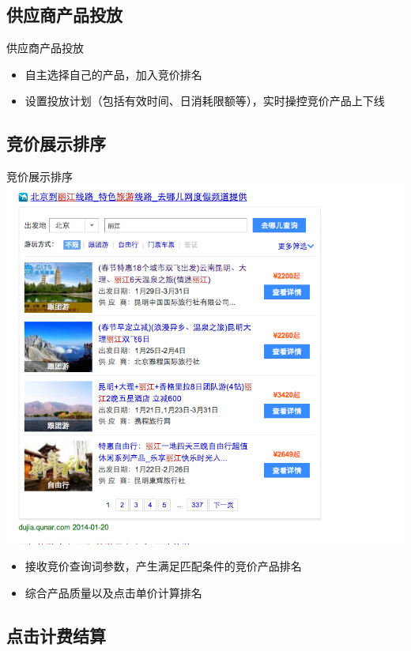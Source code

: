 \documentclass{beamer}
\begin{document}
\begin{CJK}{UTF8}{gbsn}
\subsection{供应商产品投放}
\begin{frame}{供应商产品投放}
  \begin{itemize}
  \item {
    自主选择自己的产品，加入竞价排名
    \pause
  }
  \item {
    设置投放计划（包括有效时间、日消耗限额等），实时操控竞价产品上下线
  }
  \end{itemize}
\end{frame}


\subsection{竞价展示排序}

\begin{frame}{竞价展示排序}
  \includegraphics[scale=0.25]{./imgs/overview-baidu}
  \begin{itemize}
  \item {
    接收竞价查询词参数，产生满足匹配条件的竞价产品排名
  }
  \item {
    综合产品质量以及点击单价计算排名
  }
  \end{itemize}
\end{frame}

\subsection{点击计费结算}


\end{CJK}
\end{document}
